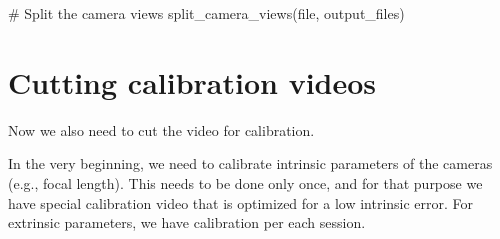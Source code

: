 \documentclass[
  letterpaper,
  DIV=11,
  numbers=noendperiod]{scrreprt}
\newenvironment{Shaded}{\begin{snugshade}}{\end{snugshade}}
\newcommand{\BuiltInTok}[1]{\textcolor[rgb]{0.00,0.23,0.31}{#1}}
\newcommand{\CommentTok}[1]{\textcolor[rgb]{0.37,0.37,0.37}{#1}}
\newcommand{\NormalTok}[1]{\textcolor[rgb]{0.00,0.23,0.31}{#1}}
\begin{document}
\begin{Shaded}
\begin{Highlighting}[]
    \CommentTok{\# Split the camera views}
\NormalTok{    split\_camera\_views(}\BuiltInTok{file}\NormalTok{, output\_files)}
\end{Highlighting}
\end{Shaded}


\chapter{Cutting calibration videos}\label{cutting-calibration-videos}

Now we also need to cut the video for calibration.

In the very beginning, we need to calibrate intrinsic parameters of the
cameras (e.g., focal length). This needs to be done only once, and for
that purpose we have special calibration video that is optimized for a
low intrinsic error. For extrinsic parameters, we have calibration per
each session.
\end{document}

